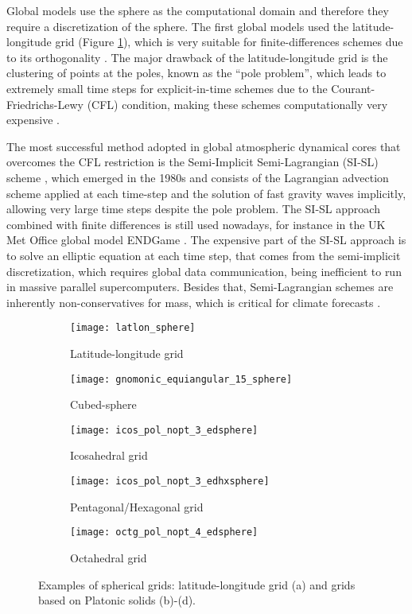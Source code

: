 Global models use the sphere as the computational domain and therefore they require a discretization
of the sphere. 
The first global models used the latitude-longitude grid (Figure \ref{latlon-grid}), which is
very suitable for finite-differences schemes due to its orthogonality \citep{will:2007}. The major drawback of the latitude-longitude grid
is the clustering of points at the poles, known as the ``pole problem'', which leads to extremely
small time steps for explicit-in-time schemes due to the Courant-Friedrichs-Lewy (CFL) condition, 
making these schemes computationally very expensive \citep{randall:2020}.

The most successful method adopted in global atmospheric dynamical cores that overcomes the CFL 
restriction is the Semi-Implicit Semi-Lagrangian (SI-SL) scheme \citep{randall:2018}, which 
emerged in the 1980s and consists of the Lagrangian advection scheme applied at each time-step 
and the solution of fast gravity waves implicitly, allowing very large time steps despite the pole problem.
The SI-SL approach combined with finite differences is still used nowadays, for instance in 
the UK Met Office global model ENDGame \citep{wood:2014}.
The expensive part of the  SI-SL approach is to solve an elliptic equation at each time step,
that comes from the semi-implicit discretization, which requires global data communication,
being inefficient to run in massive parallel supercomputers. Besides that, 
Semi-Lagrangian schemes are inherently non-conservatives for mass,
which is critical for climate forecasts \citep{will:2007}.

\begin{figure}
	\centering
	\begin{subfigure}{.3\linewidth}
		\centering
		\texttt{[image: latlon\_sphere]}
		\caption{Latitude-longitude grid}\label{latlon-grid}
	\end{subfigure}%
  \hspace{1em}%
\begin{subfigure}{.3\linewidth}
	\centering
	\texttt{[image: gnomonic\_equiangular\_15\_sphere]}
	\caption{Cubed-sphere}\label{cs-grid}
\end{subfigure}%
	\hspace{2em}%
	\begin{subfigure}{.3\linewidth}
		\centering
		\texttt{[image: icos\_pol\_nopt\_3\_edsphere]}
		\caption{Icosahedral grid}\label{icos-grid}
	\end{subfigure}
	\begin{subfigure}{.3\linewidth}
		\centering
		\texttt{[image: icos\_pol\_nopt\_3\_edhxsphere]}
		\caption{Pentagonal/Hexagonal grid}\label{voronoi-grid}
	\end{subfigure}
	\begin{subfigure}{.3\linewidth}
		\centering
		\texttt{[image: octg\_pol\_nopt\_4\_edsphere]}
		\caption{Octahedral grid}\label{octg-grid}
	\end{subfigure}
	\caption{Examples of spherical grids: latitude-longitude grid (a) and grids based on Platonic solids (b)-(d).}
\end{figure}

